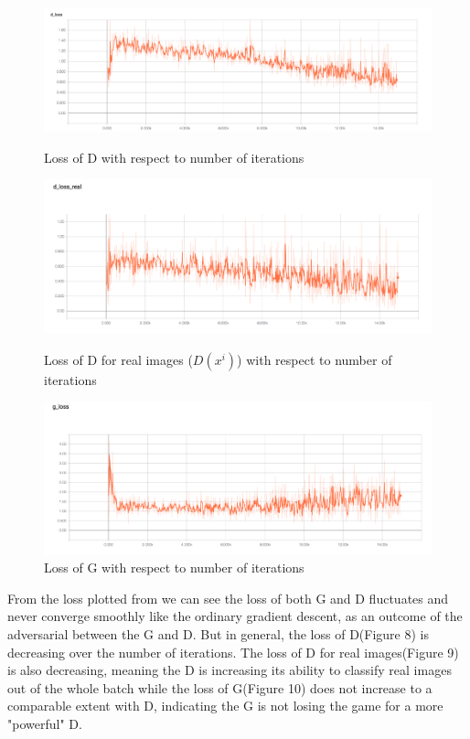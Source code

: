 \documentclass[10pt,twocolumn,letterpaper]{article}
\begin{document}
\begin{figure}[h]
\begin{center}
   \includegraphics[width=\linewidth]{img/dloss.png}
\end{center}
   \caption{Loss of D with respect to number of iterations}
\label{fig:long}
\label{fig:onecol}
\begin{center}
   \includegraphics[width=\linewidth]{img/dlossreal.png}
\end{center}
   \caption{Loss of D for real images ($D(x^i)$) with respect to number of iterations}
\label{fig:long}
\label{fig:onecol}
\begin{center}
   \includegraphics[width=\linewidth]{img/gloss.png}
\end{center}
   \caption{Loss of G with respect to number of iterations}
\label{fig:long}
\label{fig:onecol}
\end{figure}

From the loss plotted from we can see the loss of both G and D fluctuates and never converge smoothly like the ordinary gradient descent, as an outcome of the adversarial between the G and D. But in general, the loss of D(Figure 8) is decreasing over the number of iterations. The loss of D for real images(Figure 9) is also decreasing, meaning the D is increasing its ability to classify real images out of the whole batch while the loss of G(Figure 10) does not increase to a comparable extent with D, indicating the G is not losing the game for a more "powerful" D.\\
\end{document}
